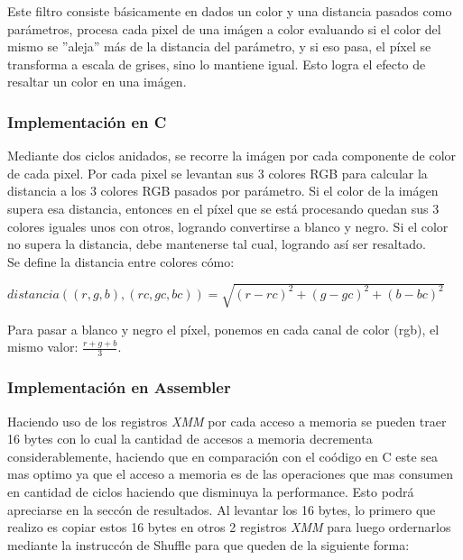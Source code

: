 Este filtro consiste b\'asicamente en dados un color y una distancia pasados como par\'ametros, procesa cada pixel de una im\'agen a color evaluando si el color del mismo se ''aleja'' m\'as de la distancia del par\'ametro, y si eso pasa, el p\'ixel se transforma a escala de grises, sino lo mantiene igual. Esto logra el efecto de resaltar un color en una im\'agen.

\subsubsection{Implementación en C}
Mediante dos ciclos anidados, se recorre la im\'agen por cada componente de color de cada pixel. Por cada pixel se levantan sus 3 colores RGB para calcular la distancia a los 3 colores RGB pasados por par\'ametro. Si el color de la im\'agen supera esa distancia, entonces en el p\'ixel que se est\'a procesando quedan sus 3 colores iguales unos con otros, logrando convertirse a blanco y negro. Si el color no supera la distancia, debe mantenerse tal cual, logrando as\'i ser resaltado.\\
Se define la distancia entre colores c\'omo:\\

\begin{center}
$distancia((r, g, b), (rc, gc, bc)) = \sqrt{(r - rc)^2 + (g - gc)^2 + (b - bc)^2}$
\end{center}

Para pasar a blanco y negro el p\'ixel, ponemos en cada canal de color (rgb), el mismo valor: $\frac{r + g + b}{3}$.

\subsubsection{Implementación en Assembler}
Haciendo uso de los registros \emph{XMM} por cada acceso a memoria se pueden traer 16 bytes con lo cual la cantidad de accesos a memoria decrementa 
considerablemente, haciendo que en comparaci\'on con el co\'odigo en C este sea mas optimo ya que el acceso a memoria es de las operaciones que mas 
consumen en cantidad de ciclos haciendo que disminuya la performance. Esto podr\'a apreciarse en la secc\'on de resultados.\newline
Al levantar los 16 bytes, lo primero que realizo es copiar estos 16 bytes en otros 2 registros \emph{XMM} para luego ordernarlos mediante la instrucc\'on
de Shuffle para que queden de la siguiente forma:

